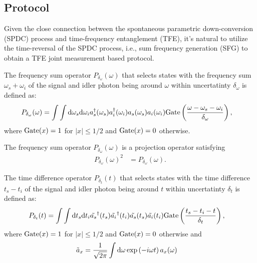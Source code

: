\documentclass[../../note.tex]{subfiles}
\begin{document}
\subsection{Protocol}
Given the close connection between the spontaneous parametric down-conversion (SPDC) process and time-frequency entanglement (TFE), it's natural to utilize the time-reversal of the SPDC process, i.e., sum frequency generation (SFG) to obtain a TFE joint measurement based protocol.

\begin{definition}
    The frequency sum operator  $P_{\delta_{\omega}}(\omega)$ that selects states with the frequency sum $\omega_s + \omega_i$ of the signal and idler photon being around $\omega$ within uncertatinty $\delta_{\omega}$  is defined as:
    \begin{align}
        P_{\delta_{\omega}}(\omega)
        &= \int \int {\rm d}\omega_s{\rm d}\omega_i a_s^\dagger(\omega_s) a_i^\dagger(\omega_i) a_s(\omega_s) a_i(\omega_i) {\rm Gate}\left(\frac{\omega -\omega_s-\omega_i}{\delta_{\omega}}\right),
    \end{align}
    where ${\rm Gate}(x) = 1$ for $\vert x \vert \leq 1/2$ and ${\rm Gate}(x) = 0$ otherwise.
\end{definition}

\begin{lemma}
    The frequency sum operator  $P_{\delta_{\omega}}(\omega)$ is a projection operator satisfying
    \begin{align}
        P_{\delta_{\omega}}(\omega)^2
        &= P_{\delta_{\omega}}(\omega).
    \end{align}
\end{lemma}

\begin{definition}
    The time difference operator $P_{\delta_{t}}(t)$ that selects states with the time difference $t_s - t_i$ of the signal and idler photon being around $t$ within uncertatinty $\delta_{t}$  is defined as:
    \begin{align}
        P_{\delta_{t}}(t)
        &= \int \int {\rm d}t_s{\rm d}t_i \tilde{a_s}^\dagger(t_s) \tilde{a_i}^\dagger(t_i) \tilde{a_s}(t_s) \tilde{a_i}(t_i) {\rm Gate}\left(\frac{t_s -t_i-t}{\delta_{t}}\right),
    \end{align}
    where ${\rm Gate}(x) = 1$ for $\vert x \vert \leq 1/2$ and ${\rm Gate}(x) = 0$ otherwise and 
    \begin{align}
        \tilde{a}_x
        &= \frac{1}{\sqrt{2 \pi}} \int {\rm d}\omega \exp\left(-i\omega t\right)a_x(\omega)
    \end{align}
\end{definition}
\end{document}
